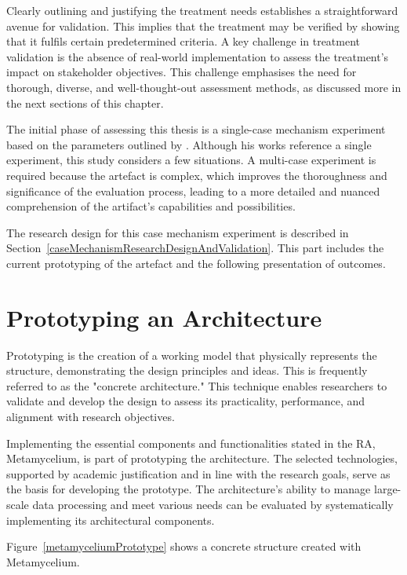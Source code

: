 \documentclass[journal]{IEEEtran}
\begin{document}
Clearly outlining and justifying the treatment needs establishes a straightforward avenue for validation. This implies that the treatment may be verified by showing that it fulfils certain predetermined criteria. A key challenge in treatment validation is the absence of real-world implementation to assess the treatment's impact on stakeholder objectives. This challenge emphasises the need for thorough, diverse, and well-thought-out assessment methods, as discussed more in the next sections of this chapter. 

The initial phase of assessing this thesis is a single-case mechanism experiment based on the parameters outlined by \cite{wieringa2014design}. Although his works reference a single experiment, this study considers a few situations. A multi-case experiment is required because the artefact is complex, which improves the thoroughness and significance of the evaluation process, leading to a more detailed and nuanced comprehension of the artifact's capabilities and possibilities. 

The research design for this case mechanism experiment is described in Section~\ref{caseMechanismResearchDesignAndValidation}. This part includes the current prototyping of the artefact and the following presentation of outcomes.


\section{Prototyping an Architecture}


Prototyping is the creation of a working model that physically represents the structure, demonstrating the design principles and ideas. This is frequently referred to as the "concrete architecture." This technique enables researchers to validate and develop the design to assess its practicality, performance, and alignment with research objectives.

Implementing the essential components and functionalities stated in the RA, Metamycelium, is part of prototyping the architecture. The selected technologies, supported by academic justification and in line with the research goals, serve as the basis for developing the prototype. The architecture's ability to manage large-scale data processing and meet various needs can be evaluated by systematically implementing its architectural components. 

Figure~\ref{metamyceliumPrototype} shows a concrete structure created with Metamycelium.
\end{document}
